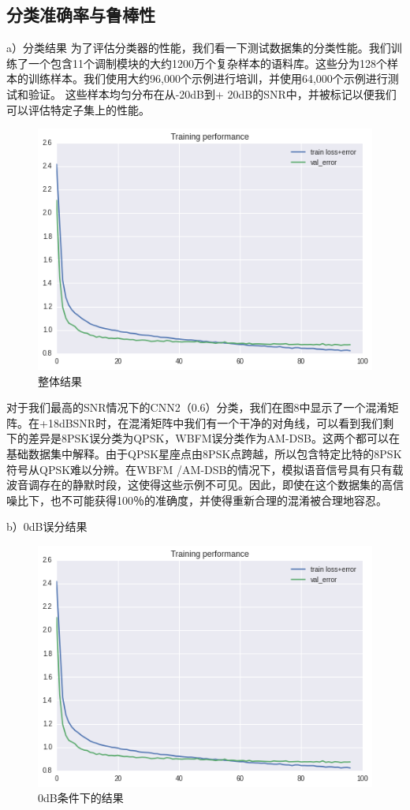 \subsection{分类准确率与鲁棒性}
a）分类结果
为了评估分类器的性能，我们看一下测试数据集的分类性能。我们训练了一个包含11个调制模块的大约1200万个复杂样本的语料库。这些分为128个样本的训练样本。我们使用大约96,000个示例进行培训，并使用64,000个示例进行测试和验证。 这些样本均匀分布在从-20dB到+ 20dB的SNR中，并被标记以便我们可以评估特定子集上的性能。\par
\begin{figure}[!h]
	\centering
	\includegraphics[scale=0.3]{figures/chapter_3/loss}
	\caption{整体结果}	\label{sec:fig_3_9}
\end{figure}
对于我们最高的SNR情况下的CNN2（0.6）分类，我们在图8中显示了一个混淆矩阵。在+18dBSNR时，在混淆矩阵中我们有一个干净的对角线，可以看到我们剩下的差异是8PSK误分类为QPSK，WBFM误分类作为AM-DSB。这两个都可以在基础数据集中解释。由于QPSK星座点由8PSK点跨越，所以包含特定比特的8PSK符号从QPSK难以分辨。在WBFM /AM-DSB的情况下，模拟语音信号具有只有载波音调存在的静默时段，这使得这些示例不可见。因此，即使在这个数据集的高信噪比下，也不可能获得100％的准确度，并使得重新合理的混淆被合理地容忍。\par

b）0dB误分结果
\begin{figure}[!h]
	\centering
	\includegraphics[scale=0.3]{figures/chapter_3/loss}
	\caption{0dB条件下的结果}	\label{sec:fig_3_10}
\end{figure}

